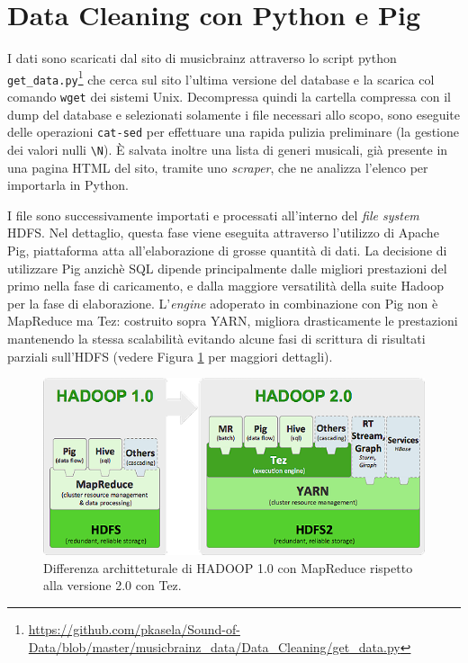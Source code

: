 \documentclass[12pt, a4paper, twocolumn]{article} %
\begin{document}
\section{Data Cleaning con Python e Pig}


I dati sono scaricati dal sito di musicbrainz attraverso lo script python \verb|get_data.py|\footnote{\url{https://github.com/pkasela/Sound-of-Data/blob/master/musicbrainz_data/Data_Cleaning/get_data.py}} che cerca sul sito l'ultima versione del database e la scarica col comando \verb|wget| dei sistemi Unix.
Decompressa quindi la cartella compressa con il dump del database e selezionati solamente i file necessari allo scopo, sono eseguite delle operazioni \verb|cat-sed| per effettuare una rapida pulizia preliminare (la gestione dei valori nulli \verb|\N|).
È salvata inoltre una lista di generi musicali, già presente in una pagina HTML del sito, tramite uno \textit{scraper}, che ne analizza l'elenco per importarla in Python.


I file sono successivamente importati e processati all'interno del \textit{file system} HDFS.
Nel dettaglio, questa fase viene eseguita attraverso l'utilizzo di Apache Pig, piattaforma atta all'elaborazione di grosse quantità di dati.
La decisione di utilizzare Pig anzichè SQL dipende principalmente dalle migliori prestazioni del primo nella fase di caricamento, e dalla maggiore versatilità della suite Hadoop per la fase di elaborazione.
L'\textit{engine} adoperato in combinazione con Pig non è MapReduce ma Tez: costruito sopra YARN, migliora drasticamente le prestazioni mantenendo la stessa scalabilità evitando alcune fasi di scrittura di risultati parziali sull'HDFS (vedere Figura \ref{fig:Hadoop} per maggiori dettagli).

\begin{figure}
  \centering
  \includegraphics[width=\linewidth]{hadoop2.png}
  \caption{Differenza architteturale di HADOOP 1.0 con MapReduce rispetto alla versione 2.0 con Tez.}
  \label{fig:Hadoop}
\end{figure}
\end{document}
